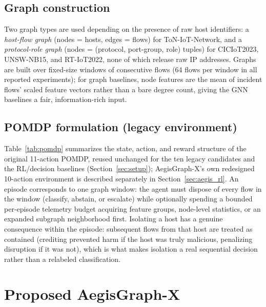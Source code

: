 \documentclass[journal]{IEEEtran}
\begin{document}
\subsection{Graph construction}
Two graph types are used depending on the presence of raw host identifiers:
a \emph{host-flow graph} (nodes = hosts, edges = flows) for ToN-IoT-Network,
and a \emph{protocol-role graph} (nodes = (protocol, port-group, role)
tuples) for CICIoT2023, UNSW-NB15, and RT-IoT2022, none of which release raw
IP addresses. Graphs are built over fixed-size windows of consecutive flows
(64 flows per window in all reported experiments); for graph baselines, node
features are the mean of incident flows' scaled feature vectors rather than a
bare degree count, giving the GNN baselines a fair, information-rich input.

\subsection{POMDP formulation (legacy environment)}
Table~\ref{tab:pomdp} summarizes the state, action, and reward structure of
the original 11-action POMDP, reused unchanged for the ten legacy candidates
and the RL/decision baselines (Section~\ref{sec:setup}); AegisGraph-X's own
redesigned 10-action environment is described separately in
Section~\ref{sec:aegis_rl}. An episode corresponds to one graph window: the
agent must dispose of every flow
in the window (classify, abstain, or escalate) while optionally spending a
bounded per-episode telemetry budget acquiring feature groups, node-level
statistics, or an expanded subgraph neighborhood first. Isolating a host has
a genuine consequence within the episode: subsequent flows from that host are
treated as contained (crediting prevented harm if the host was truly
malicious, penalizing disruption if it was not), which is what makes
isolation a real sequential decision rather than a relabeled classification.



\section{Proposed AegisGraph-X}
\label{sec:method}
\end{document}
